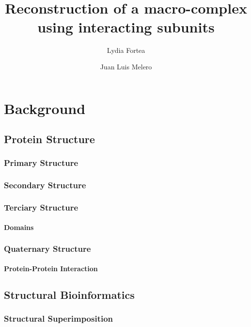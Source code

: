 \documentclass[a4paper,12pt]{report}
\title{Reconstruction of a macro-complex using interacting subunits}
\author{Lydia Fortea \and Juan Luis Melero}
\date{}
\begin{document}
\maketitle
\tableofcontents{}

\chapter{Background}


\section{Protein Structure}

\subsection{Primary Structure}

\subsection{Secondary Structure}

\subsection{Terciary Structure}

\subsubsection{Domains}

\subsection{Quaternary Structure}

\subsubsection{Protein-Protein Interaction}





\section{Structural Bioinformatics}

\subsection{Structural Superimposition}
\end{document}
